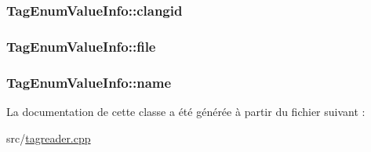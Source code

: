 \subsubsection[{clangid}]{ Tag\+Enum\+Value\+Info\+::clangid}\label{class_tag_enum_value_info_ab5084426052301a148357fde91974253}
\hypertarget{class_tag_enum_value_info_a5f25892dd8fae1bb87c645397a5152f0}{}
\subsubsection[{file}]{ Tag\+Enum\+Value\+Info\+::file}\label{class_tag_enum_value_info_a5f25892dd8fae1bb87c645397a5152f0}
\hypertarget{class_tag_enum_value_info_a39757957cc24cb10975e073b3f32d6c9}{}
\subsubsection[{name}]{ Tag\+Enum\+Value\+Info\+::name}\label{class_tag_enum_value_info_a39757957cc24cb10975e073b3f32d6c9}


La documentation de cette classe a été générée à partir du fichier suivant \+:\begin{DoxyCompactItemize}
\item 
src/\hyperlink{tagreader_8cpp}{tagreader.\+cpp}\end{DoxyCompactItemize}
